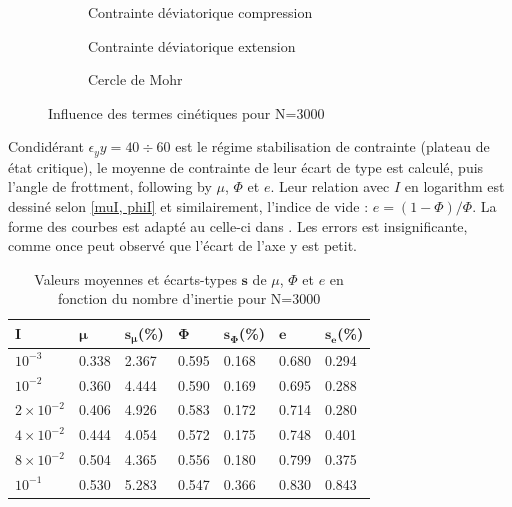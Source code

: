 \documentclass[5p,authoryear,square]{elsarticle}
\begin{document}
\begin{figure}[htbp]
    \centering
    \begin{subfigure}[b]{0.45\textwidth}
        \centering
        \scalebox{0.5}{}
        \caption{Contrainte déviatorique compression}
        \label{3000_comp}
    \end{subfigure}
    \hfill
    \begin{subfigure}[b]{0.45\textwidth}
        \centering
        \scalebox{0.5}{}
        \caption{Contrainte déviatorique extension}
        \label{3000_ext}
    \end{subfigure}
    
    \begin{subfigure}[b]{0.45\textwidth}
        \centering
        \scalebox{0.5}{}
        \caption{Cercle de Mohr}
        \label{300_cercle}
    \end{subfigure}
    \caption{Influence des termes cinétiques pour N=3000}
    \label{3000_Mohr}
\end{figure}
Condidérant $\epsilon_yy = 40 \div 60$ est le régime stabilisation de contrainte (plateau de état critique), le moyenne de contrainte de leur écart de type est calculé, puis l'angle de frottment, following by $\mu$, $\Phi$ et $e$.
Leur relation avec $I$ en logarithm est dessiné selon \cref{muI, phiI} et similairement, l'indice de vide : $e = (1-\Phi)/\Phi$.
La forme des courbes est adapté au celle-ci dans \citep{da2005rheophysics}.  
Les errors est insignificante, comme once peut observé que l'écart de l'axe y est petit.

\begin{table}[htbp]
\centering
\small
\begin{tabular}{@{}lllllll@{}}
\toprule
\textbf{I} & $\boldsymbol{\mu}$ & $\boldsymbol{s_{\mu}}$(\%) & $\boldsymbol{\Phi}$ & $\boldsymbol{s_{\Phi}}$(\%) & $\boldsymbol{e}$ & $\boldsymbol{s_{e}}$(\%) \\
\midrule
$10^{-3}$ & 0.338 & 2.367 & 0.595 & 0.168 & 0.680 & 0.294 \\
$10^{-2}$ & 0.360 & 4.444 & 0.590 & 0.169 & 0.695 & 0.288 \\
$2 \times 10^{-2}$ & 0.406 & 4.926 & 0.583 & 0.172 & 0.714 & 0.280 \\
$4 \times 10^{-2}$ & 0.444 & 4.054 & 0.572 & 0.175 & 0.748 & 0.401 \\
$8 \times 10^{-2}$ & 0.504 & 4.365 & 0.556 & 0.180 & 0.799 & 0.375 \\
$10^{-1}$ & 0.530 & 5.283 & 0.547 & 0.366 & 0.830 & 0.843 \\
\bottomrule
\end{tabular}
\caption{Valeurs moyennes et écarts-types $\boldsymbol{s}$ de $\mu$, $\Phi$ et $e$ en fonction du nombre d'inertie pour N=3000}
\label{table_rheologie_stats}
\end{table}
\end{document}
